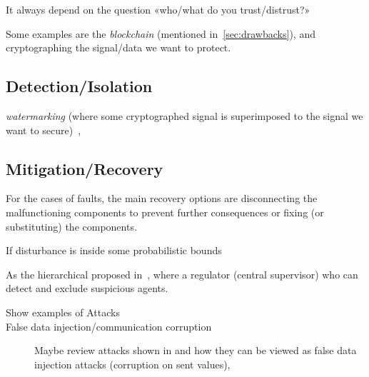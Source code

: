 \documentclass[../main.tex]{subfiles}
\begin{document}
It always depend on the question «who/what do you trust/distrust?»

Some examples are the \emph{blockchain} (mentioned in~\ref{sec:drawbacks}), and cryptographing the signal/data we want to protect.

\subsection{Detection/Isolation}
\emph{watermarking} (where some cryptographed signal is superimposed to the signal we want to secure)~\cite{MoEtAl2015,SatchidanandanKumar2017,KshetriVoas2017,LuciaEtAl2021},
\cite{FortiEtAl2016}

\subsection{Mitigation/Recovery}
For the cases of faults, the main recovery options are disconnecting the malfunctioning components to prevent further consequences or fixing (or substituting) the components.

If disturbance is inside some probabilistic bounds \cite{AnandutaEtAl2020}



As the hierarchical proposed in~\cite{BraunEtAl2020}, where a regulator (central supervisor) who can detect and exclude suspicious agents.


\begin{description}
  \item[Show examples of Attacks]
  \item[False data injection/communication corruption] Maybe review attacks shown in \cite{VelardeEtAl2017} and how they can be viewed as false data injection attacks (corruption on sent values), 
\end{description}

\printbibliography%
\end{document}
